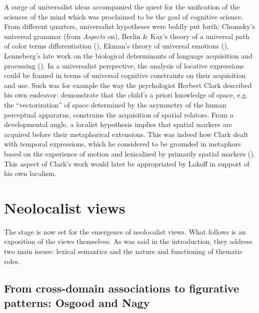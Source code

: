 \documentclass[english,output=paper,colorlinks,citecolor=brown]{../langscibook}
\begin{document}
A surge of universalist ideas accompanied the quest for the unification of the sciences of the mind which was proclaimed to be the goal of cognitive science. From different quarters, universalist hypotheses were boldly put forth: Chomsky’s universal grammar (from \textit{Aspects} on), Berlin \& Kay’s theory of a universal path of color terms differentiation (\citealt{BerlinKay1969}), Ekman’s theory of universal emotions (\citealt{Ekman1971}), Lenneberg’s late work on the biological determinants of language acquisition and processing (\citealt{Lenneberg1967}). In a universalist perspective, the analysis of locative expressions could be framed in terms of universal cognitive constraints on their acquisition and use. Such was for example the way the psychologist Herbert Clark described his own endeavor: demonstrate that the child’s a priori knowledge of space, e.g. the “vectorization” of space determined by the asymmetry of the human perceptual apparatus, constrains the acquisition of spatial relators. From a developmental angle, a localist hypothesis implies that spatial markers are acquired before their metaphorical extensions. This was indeed how Clark dealt with temporal expressions, which he considered to be grounded in metaphors based on the experience of motion and lexicalized by primarily spatial markers (\citealt{Clark1973}). This aspect of Clark’s work would later be appropriated by Lakoff in support of his own localism. 

\section{Neolocalist views}

The stage is now set for the emergence of neolocalist views. What follows is an exposition of the views themselves. As was said in the introduction, they address two main issues: lexical semantics and the nature and functioning of thematic roles. 

\subsection{From cross-domain associations to figurative patterns: Osgood and Nagy}
\end{document}
